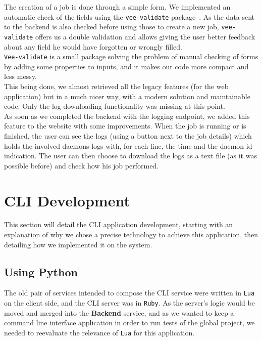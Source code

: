 \documentclass{eplmastersthesis}
\begin{document}
        The creation of a job is done through a simple form. We implemented
        an automatic check of the fields using the \texttt{vee-validate}
        package~\cite{VeeValidate}. As the data sent to the backend is also
        checked before using those to create a new job, \texttt{vee-validate} offers us
        a double validation and allows giving the user better feedback
        about any field he would have forgotten or wrongly filled.\\
        \texttt{Vee-validate} is a small package solving the problem of
        manual checking of forms by adding some properties to inputs, and it
        makes our code more compact and less messy.\\

        This being done, we almost retrieved all the legacy features (for the
        web application) but in a much nicer way, with a modern solution
        and maintainable code. Only the log downloading functionality was
        missing at this point. \\
        As soon as we completed the backend with the logging endpoint, we
        added this feature to the website with some improvements. When the
        job is running or is finished, the user can see the logs (using a
        button next to the job details) which holds the involved daemons logs
        with, for each line, the time and the daemon id indication. The user
        can then choose to download the logs as a text file (as it was possible
        before) and check how his job performed.

    \section{CLI Development}

      This section will detail the CLI application development, starting
      with an explanation of why we chose a precise technology to achieve
      this application, then detailing how we implemented it on the system.

      \subsection{Using Python}

        The old pair of services intended to compose the CLI service were
        written in \texttt{Lua} on the client side, and the CLI server was in \texttt{Ruby}. As
        the server's logic would be moved and merged into the \textbf{Backend}
        service, and as we wanted to keep a command line interface application
        in order to run tests of the global project, we needed to reevaluate
        the relevance of \texttt{Lua} for this application.\\
\end{document}
